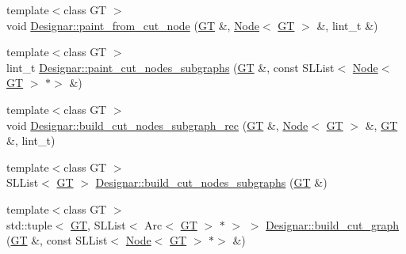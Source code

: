 \begin{DoxyCompactItemize}
\item 
{\footnotesize template$<$class GT $>$ }\\void \hyperlink{namespace_designar_a0b57b399593e711bef1c99a4c41c238a}{Designar\+::paint\+\_\+from\+\_\+cut\+\_\+node} (\hyperlink{demo-buildgraph_8_c_a3001c40d2c31ca87ed96cd7d1334a55e}{GT} \&, \hyperlink{test-mtreenode_8_c_a17a24b0725f59987143c5faf63c4dc6f}{Node}$<$ \hyperlink{demo-buildgraph_8_c_a3001c40d2c31ca87ed96cd7d1334a55e}{GT} $>$ \&, lint\+\_\+t \&)
\item 
{\footnotesize template$<$class GT $>$ }\\lint\+\_\+t \hyperlink{namespace_designar_a4a53202e6320a9435f829867671c26c1}{Designar\+::paint\+\_\+cut\+\_\+nodes\+\_\+subgraphs} (\hyperlink{demo-buildgraph_8_c_a3001c40d2c31ca87ed96cd7d1334a55e}{GT} \&, const S\+L\+List$<$ \hyperlink{test-mtreenode_8_c_a17a24b0725f59987143c5faf63c4dc6f}{Node}$<$ \hyperlink{demo-buildgraph_8_c_a3001c40d2c31ca87ed96cd7d1334a55e}{GT} $>$ $\ast$$>$ \&)
\item 
{\footnotesize template$<$class GT $>$ }\\void \hyperlink{namespace_designar_aecd027238b87a5b24792ea3ccd0c44b1}{Designar\+::build\+\_\+cut\+\_\+nodes\+\_\+subgraph\+\_\+rec} (\hyperlink{demo-buildgraph_8_c_a3001c40d2c31ca87ed96cd7d1334a55e}{GT} \&, \hyperlink{test-mtreenode_8_c_a17a24b0725f59987143c5faf63c4dc6f}{Node}$<$ \hyperlink{demo-buildgraph_8_c_a3001c40d2c31ca87ed96cd7d1334a55e}{GT} $>$ \&, \hyperlink{demo-buildgraph_8_c_a3001c40d2c31ca87ed96cd7d1334a55e}{GT} \&, lint\+\_\+t)
\item 
{\footnotesize template$<$class GT $>$ }\\S\+L\+List$<$ \hyperlink{demo-buildgraph_8_c_a3001c40d2c31ca87ed96cd7d1334a55e}{GT} $>$ \hyperlink{namespace_designar_a8e15ec16859d46fd3c50bb9a295a1ea6}{Designar\+::build\+\_\+cut\+\_\+nodes\+\_\+subgraphs} (\hyperlink{demo-buildgraph_8_c_a3001c40d2c31ca87ed96cd7d1334a55e}{GT} \&)
\item 
{\footnotesize template$<$class GT $>$ }\\std\+::tuple$<$ \hyperlink{demo-buildgraph_8_c_a3001c40d2c31ca87ed96cd7d1334a55e}{GT}, S\+L\+List$<$ Arc$<$ \hyperlink{demo-buildgraph_8_c_a3001c40d2c31ca87ed96cd7d1334a55e}{GT} $>$ $\ast$ $>$ $>$ \hyperlink{namespace_designar_a552f77707068bde5a4449192a1105012}{Designar\+::build\+\_\+cut\+\_\+graph} (\hyperlink{demo-buildgraph_8_c_a3001c40d2c31ca87ed96cd7d1334a55e}{GT} \&, const S\+L\+List$<$ \hyperlink{test-mtreenode_8_c_a17a24b0725f59987143c5faf63c4dc6f}{Node}$<$ \hyperlink{demo-buildgraph_8_c_a3001c40d2c31ca87ed96cd7d1334a55e}{GT} $>$ $\ast$$>$ \&)

\end{DoxyCompactItemize}
